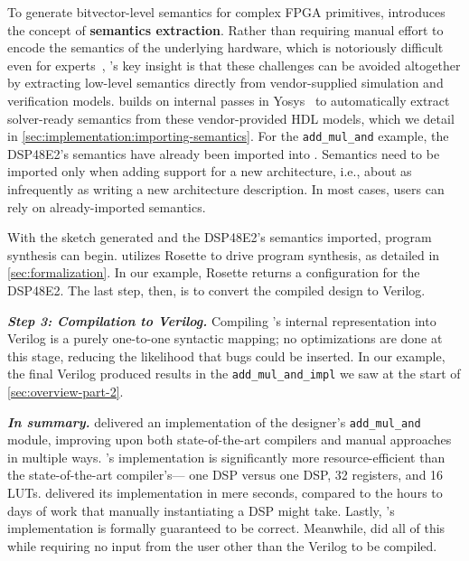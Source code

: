 To generate bitvector-level semantics
  for complex FPGA primitives,
  \lr introduces the concept of
  \textbf{semantics extraction}.
Rather than requiring
  manual effort to encode the semantics
  of the underlying hardware,
  which is notoriously difficult
  even for experts~\cite{Bernstein2021WhatAT},
  \lr's key insight is that these challenges
  can be avoided altogether
  by extracting low-level semantics
  directly from
  vendor-supplied simulation and verification models.
\lr builds on internal passes in 
  Yosys~\cite{wolf2013yosys} 
  to automatically extract
  solver-ready semantics from these vendor-provided HDL models,
  which we detail in \cref{sec:implementation:importing-semantics}.
For the
  \texttt{add\_mul\_and} example,
  the DSP48E2's semantics have already been imported into \lr.
Semantics need to be imported only when
  adding support for a new architecture, i.e., %
  about as infrequently
  as writing a new architecture description.
In most cases,
  \lr users can rely on already-imported semantics.
  
With the sketch generated
  and the DSP48E2's semantics imported,
  program synthesis can begin.
\lr utilizes Rosette to drive program synthesis,
  as detailed in \cref{sec:formalization}.
In our example, Rosette returns
  a configuration for the DSP48E2.
The last step, then, is to convert
  the compiled design
  to Verilog.
  
\textit{\textbf{Step 3: Compilation to Verilog.}}
Compiling \lr's internal representation into Verilog
  is a purely 
  one-to-one syntactic mapping;
  no optimizations are done at this stage,
  reducing the likelihood that bugs could be inserted.
In our example,
  the final Verilog produced
  results in the
  \texttt{add\_mul\_and\_impl}
  we saw at the start of \cref{sec:overview-part-2}.

\textit{\textbf{In summary.}}
\lr
  delivered 
  an implementation
  of the designer's
  \texttt{add\_mul\_and}
  module,
  improving upon both state-of-the-art compilers
  and manual approaches
  in multiple ways.
\lr's implementation
  is significantly more resource-efficient
  than the state-of-the-art compiler's---%
  one DSP versus one DSP,
  32 registers, and 16 LUTs.
\lr delivered its implementation
  in mere seconds,
  compared to the hours to days
  of work
  that manually instantiating
  a DSP might take.
Lastly,
  \lr's implementation
  is formally guaranteed to be correct.
Meanwhile, \lr did all of this
  while requiring no input from the user
  other than the Verilog to be compiled.

